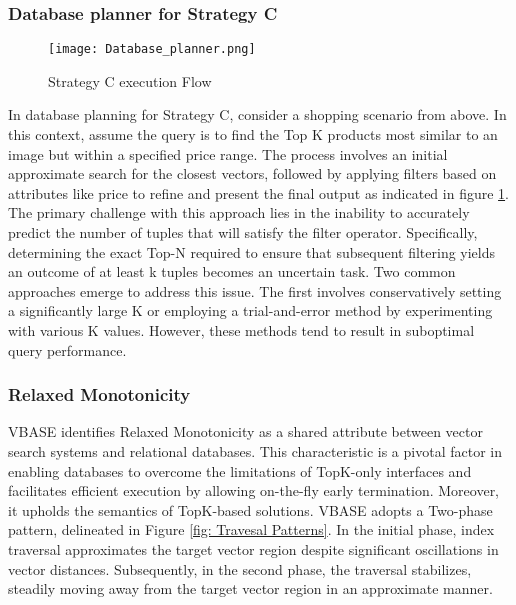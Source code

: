\documentclass[conference]{IEEEtran}
\begin{document}
\subsubsection{Database planner for Strategy C}

\begin{figure}[h!]
  \centering
  \texttt{[image: Database\_planner.png]}
  \caption{Strategy C execution Flow}
  \label{fig: Database Planner}
\end{figure}

In database planning for Strategy C, consider a shopping scenario from above. In this context, assume the query is to find the Top K products most similar to an image but within a specified price range. The process involves an initial approximate search for the closest vectors, followed by applying filters based on attributes like price to refine and present the final output as indicated in figure \ref{fig: Database Planner}. The primary challenge with this approach lies in the inability to accurately predict the number of tuples that will satisfy the filter operator. Specifically, determining the exact Top-N required to ensure that subsequent filtering yields an outcome of at least k tuples becomes an uncertain task. Two common approaches emerge to address this issue. The first involves conservatively setting a significantly large K or employing a trial-and-error method by experimenting with various K values. However, these methods tend to result in suboptimal query performance.
\\

\subsubsection{Relaxed Monotonicity} \cite{288618}
VBASE identifies Relaxed Monotonicity as a shared attribute between vector search systems and relational databases. This characteristic is a pivotal factor in enabling databases to overcome the limitations of TopK-only interfaces and facilitates efficient execution by allowing on-the-fly early termination. Moreover, it upholds the semantics of TopK-based solutions. VBASE adopts a Two-phase pattern, delineated in Figure \ref{fig: Travesal Patterns}. In the initial phase, index traversal approximates the target vector region despite significant oscillations in vector distances. Subsequently, in the second phase, the traversal stabilizes, steadily moving away from the target vector region in an approximate manner.
\\
\end{document}

